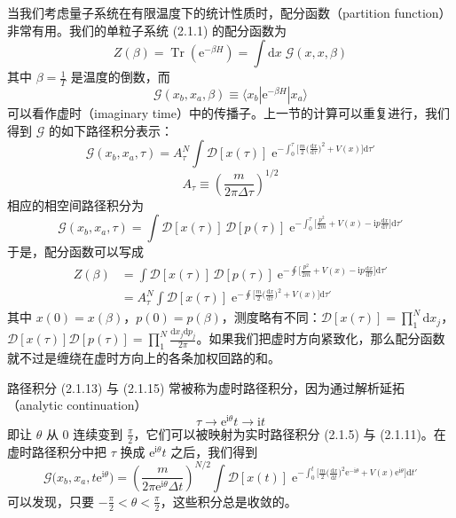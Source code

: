 当我们考虑量子系统在有限温度下的统计性质时，配分函数（partition function）非常有用。我们的单粒子系统 (2.1.1) 的配分函数为
\begin{equation*}
Z(\beta) = \operatorname{Tr}\left(\mathrm{e}^{-\beta H}\right) = \int \mathrm{d}x\; \mathcal{G}(x,x,\beta)
\end{equation*}
其中 $\beta = \frac{1}{T}$ 是温度的倒数，而
\begin{equation*}
\mathcal{G}(x_b,x_a,\beta) \equiv \langle x_b|\mathrm{e}^{-\beta H}|x_a\rangle
\end{equation*}
可以看作虚时（imaginary time）中的传播子。上一节的计算可以重复进行，我们得到 $\mathcal{G}$ 的如下路径积分表示：
\begin{equation*}
\mathcal{G}(x_b,x_a,\tau) = A_{\tau}^N \int \mathcal{D}[x(\tau)]\; \mathrm{e}^{-\int_0^{\tau} \big[\frac{m}{2}\big(\frac{\mathrm{d}x}{\mathrm{d}\tau}\big)^2 + V(x)\big]\mathrm{d}\tau'} \tag{2.1.13}
\end{equation*}
\begin{equation*}
A_{\tau} \equiv \left(\frac{m}{2\pi\Delta\tau}\right)^{1/2} \tag{2.1.14}
\end{equation*}
相应的相空间路径积分为
\begin{equation*}
\mathcal{G}(x_b,x_a,\tau) = \int \mathcal{D}[x(\tau)]\,\mathcal{D}[p(\tau)]\; \mathrm{e}^{-\int_0^{\tau} \big[\frac{p^2}{2m} + V(x) - \mathrm{i}p\frac{\mathrm{d}x}{\mathrm{d}\tau}\big]\mathrm{d}\tau'} \tag{2.1.15}
\end{equation*}
于是，配分函数可以写成
\begin{align*}
Z(\beta) &= \int \mathcal{D}[x(\tau)]\,\mathcal{D}[p(\tau)]\; \mathrm{e}^{-\oint \big[\frac{p^2}{2m} + V(x) - \mathrm{i}p\frac{\mathrm{d}x}{\mathrm{d}\tau}\big]\mathrm{d}\tau'}\\
&= A_{\tau}^N \int \mathcal{D}[x(\tau)]\; \mathrm{e}^{-\oint \big[\frac{m}{2}\big(\frac{\mathrm{d}x}{\mathrm{d}\tau}\big)^2 + V(x)\big]\mathrm{d}\tau'}
\end{align*}
其中 $x(0) = x(\beta)$，$p(0) = p(\beta)$，测度略有不同：$\mathcal{D}[x(\tau)] = \prod_1^{N}\mathrm{d}x_j$，$\mathcal{D}[x(\tau)]\mathcal{D}[p(\tau)] = \prod_1^{N}\frac{\mathrm{d}x_j\mathrm{d}p_j}{2\pi}$。如果我们把虚时方向紧致化，那么配分函数就不过是缠绕在虚时方向上的各条加权回路的和。

路径积分 (2.1.13) 与 (2.1.15) 常被称为虚时路径积分，因为通过解析延拓（analytic continuation）
\begin{equation*}
\tau \to \mathrm{e}^{\mathrm{i}\theta}t \to \mathrm{i}t
\end{equation*}
即让 $\theta$ 从 $0$ 连续变到 $\frac{\pi}{2}$，它们可以被映射为实时路径积分 (2.1.5) 与 (2.1.11)。在虚时路径积分中把 $\tau$ 换成 $\mathrm{e}^{\mathrm{i}\theta}t$ 之后，我们得到
\begin{equation*}
\mathcal{G}\big(x_b,x_a,t\mathrm{e}^{\mathrm{i}\theta}\big) = \left(\frac{m}{2\pi\mathrm{e}^{\mathrm{i}\theta}\Delta t}\right)^{N/2} \int \mathcal{D}[x(t)]\; \mathrm{e}^{-\int_0^{t} \big[\frac{m}{2}\big(\frac{\mathrm{d}x}{\mathrm{d}t}\big)^2\mathrm{e}^{-\mathrm{i}\theta} + V(x)\mathrm{e}^{\mathrm{i}\theta}\big]\mathrm{d}t'}
\end{equation*}
可以发现，只要 $-\frac{\pi}{2} < \theta < \frac{\pi}{2}$，这些积分总是收敛的。

